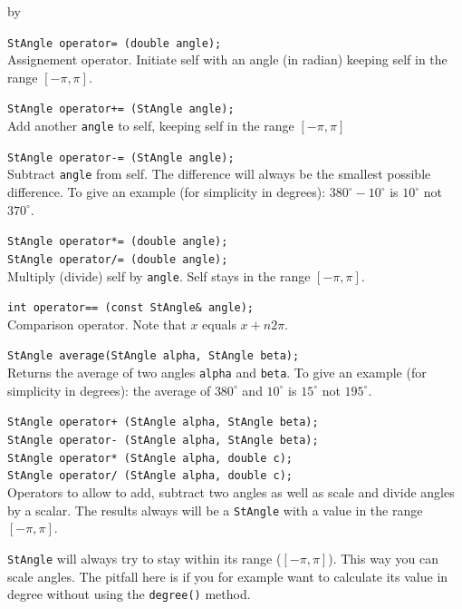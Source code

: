 \documentclass[twoside]{article}
\newcommand{\entrylabel}[1]{\mbox{\textbf{{#1}}}\hfil}%
\newenvironment{entry}
{\begin{list}{}%
    {\renewcommand{\makelabel}{\entrylabel}%
     \setlength{\labelwidth}{90pt}%
     \setlength{\leftmargin}{\labelwidth}
     \advance\leftmargin by \labelsep%
      }%
    }%
  {\end{list}}
\newcommand{\Entrylabel}[1]%
{\raisebox{0pt}[1ex][0pt]{\makebox[\labelwidth][l]%
    {\parbox[t]{\labelwidth}{\hspace{0pt}\textbf{{#1}}}}}}
\newenvironment{Entry}%
{\renewcommand{\entrylabel}{\Entrylabel}\begin{entry}}%
  {\end{entry}}
\begin{document}
\begin{Entry}
    \verb+StAngle operator= (double angle);+\\
    Assignement operator. Initiate self with an angle (in radian)
    keeping self in the range $[-\pi, \pi]$.

    \verb#StAngle operator+= (StAngle angle);#\\
    Add another \texttt{angle} to self, keeping self in the range $[-\pi, \pi]$

    \verb+StAngle operator-= (StAngle angle);+\\
    Subtract \texttt{angle} from self. The difference will always be the
    smallest possible difference. To give an example (for simplicity in degrees):
    $380^\circ - 10^\circ$ is $10^\circ$ not $370^\circ$.

    \verb+StAngle operator*= (double angle);+\\
    \verb+StAngle operator/= (double angle);+\\
    Multiply (divide) self by \texttt{angle}. Self stays in the range $[-\pi, \pi]$.
  
    \verb+int operator== (const StAngle& angle);+\\
    Comparison operator. Note that $x$ equals $x + n 2 \pi$.

\item[Global Functions]
    \verb+StAngle average(StAngle alpha, StAngle beta);+\\
    Returns the average of two angles \texttt{alpha} and \texttt{beta}.
    To give an example (for simplicity in degrees):
    the average of $380^\circ$ and $10^\circ$ is $15^\circ$ not $195^\circ$.    
    
\item[Global Operators]
    \verb#StAngle operator+ (StAngle alpha, StAngle beta);#\\
    \verb+StAngle operator- (StAngle alpha, StAngle beta);+\\
    \verb+StAngle operator* (StAngle alpha, double c);+\\
    \verb+StAngle operator/ (StAngle alpha, double c);+\\
    Operators to allow to add, subtract two angles as well as
    scale and divide angles by a scalar. The results always will
    be a \texttt{StAngle} with a value in the range $[-\pi, \pi]$.
    
\item[Pitfalls]

    \texttt{StAngle} will always try to stay within its
    range ($[-\pi, \pi]$).  This way you can scale angles. The pitfall
    here is if you for example want to calculate its value in degree
    without using the \texttt{degree()} method.
    

\end{Entry}
\end{document}
